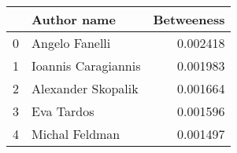\begin{tabular}{llr}
\toprule
{} &          Author name &  Betweeness \\
\midrule
0 &       Angelo Fanelli &    0.002418 \\
1 &  Ioannis Caragiannis &    0.001983 \\
2 &   Alexander Skopalik &    0.001664 \\
3 &           Eva Tardos &    0.001596 \\
4 &       Michal Feldman &    0.001497 \\
\bottomrule
\end{tabular}
